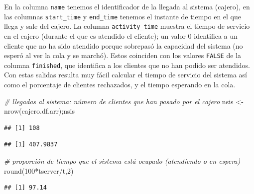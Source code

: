 \documentclass[
]{book}
\newenvironment{Shaded}{\begin{snugshade}}{\end{snugshade}}
\newcommand{\CommentTok}[1]{\textcolor[rgb]{0.56,0.35,0.01}{\textit{#1}}}
\newcommand{\DecValTok}[1]{\textcolor[rgb]{0.00,0.00,0.81}{#1}}
\newcommand{\FunctionTok}[1]{\textcolor[rgb]{0.00,0.00,0.00}{#1}}
\newcommand{\NormalTok}[1]{#1}
\newcommand{\OtherTok}[1]{\textcolor[rgb]{0.56,0.35,0.01}{#1}}
\newcommand{\SpecialCharTok}[1]{\textcolor[rgb]{0.00,0.00,0.00}{#1}}
\theoremstyle{definition}
\theoremstyle{definition}
\theoremstyle{definition}
\theoremstyle{definition}
\theoremstyle{remark}
\begin{document}
En la columna \texttt{name} tenemos el identificador de la llegada al sistema (cajero), en las columnas \texttt{start\_time} y \texttt{end\_time} tenemos el instante de tiempo en el que llega y sale del cajero. La columna \texttt{activity\_time} muestra el tiempo de servicio en el cajero (durante el que es atendido el cliente); un valor 0 identifica a un cliente que no ha sido atendido porque sobrepasó la capacidad del sistema (no esperó al ver la cola y se marchó). Estos coinciden con los valores \texttt{FALSE} de la columna \texttt{finished}, que identifica a los clientes que no han podido ser atendidos. Con estas salidas resulta muy fácil calcular el tiempo de servicio del sistema así como el porcentaje de clientes rechazados, y el tiempo esperando en la cola.

\begin{Shaded}
\begin{Highlighting}[]
\CommentTok{\# llegadas al sistema: número de clientes que han pasado por el cajero}
\NormalTok{nsis }\OtherTok{\textless{}{-}} \FunctionTok{nrow}\NormalTok{(cajero.df.arr);nsis}
\end{Highlighting}
\end{Shaded}

\begin{verbatim}
## [1] 108
\end{verbatim}

\begin{Shaded}
\end{Shaded}

\begin{verbatim}
## [1] 407.9837
\end{verbatim}

\begin{Shaded}
\begin{Highlighting}[]
\CommentTok{\# proporción de tiempo que el sistema está ocupado (atendiendo o en espera)}
\FunctionTok{round}\NormalTok{(}\DecValTok{100}\SpecialCharTok{*}\NormalTok{tserver}\SpecialCharTok{/}\NormalTok{t,}\DecValTok{2}\NormalTok{)}
\end{Highlighting}
\end{Shaded}

\begin{verbatim}
## [1] 97.14
\end{verbatim}
\end{document}
